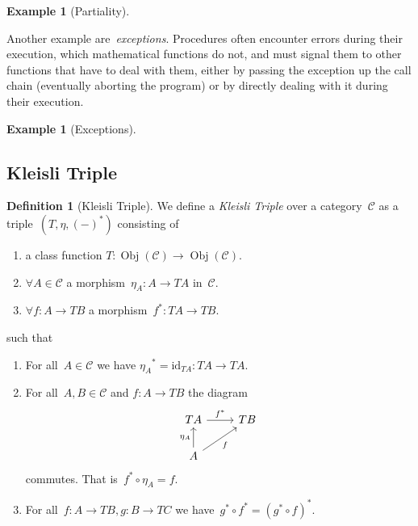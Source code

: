 \documentclass[a4paper]{article}
\theoremstyle{plain}
\newtheorem{example}[theorem]{Example}
\theoremstyle{definition}
\newtheorem{definition}[theorem]{Definition}
\DeclareMathOperator{\Obj}{Obj}
\newcommand{\id}{\mathrm{id}}
\newcommand{\cat}[1]{\mathcal{#1}}
\begin{document}
\begin{example}[Partiality]
\end{example}

Another example are~\emph{exceptions}. Procedures often encounter errors during
their execution, which mathematical functions do not, and must signal them to
other functions that have to deal with them, either by passing the exception up
the call chain (eventually aborting the program) or by directly dealing with it
during their execution.

\begin{example}[Exceptions]
\end{example}

\subsection{Kleisli Triple}
\begin{definition}[Kleisli Triple]
    \label{def:kleisli-triple}
    We define a \emph{Kleisli Triple} over a category~\(\cat{C}\)
    as a triple~\((T, \eta, (-)^{\ast})\) consisting of
    \begin{enumerate}
        \item a class function
            \(T:\Obj(\cat{C})\longrightarrow\Obj(\cat{C})\).
        \item \(\forall A\in\cat{C}\)
            a morphism~\(\eta_{A}:A\longrightarrow TA\)
            in~\(\cat{C}\).
        \item \(\forall f:A\longrightarrow TB\)
            a morphism~\(f^{\ast}:TA\longrightarrow TB\).
    \end{enumerate}
    such that
    \begin{enumerate}
        \item For all~\(A\in\cat{C}\) we have
            \({\eta_{A}}^{\ast} = \id_{TA}:TA\longrightarrow TA\).
        \item For all~\(A,B\in\cat{C}\)
            and \(f:A\longrightarrow TB\)
            the diagram
            \[\begin{tikzcd}
                TA \arrow[r, "f^{\ast}"] & TB \\
                A \arrow[u, "\eta_{A}"] \arrow[ur, "f", swap] &
            \end{tikzcd}\]
            commutes. That is~\(f^{\ast}\circ\eta_{A} = f\).
        \item For all~\(f:A\to TB,g:B\to TC\) we
            have~\(g^{\ast}\circ f^{\ast} = (g^{\ast}\circ f)^{\ast}\).
    \end{enumerate}
\end{definition}
\end{document}
